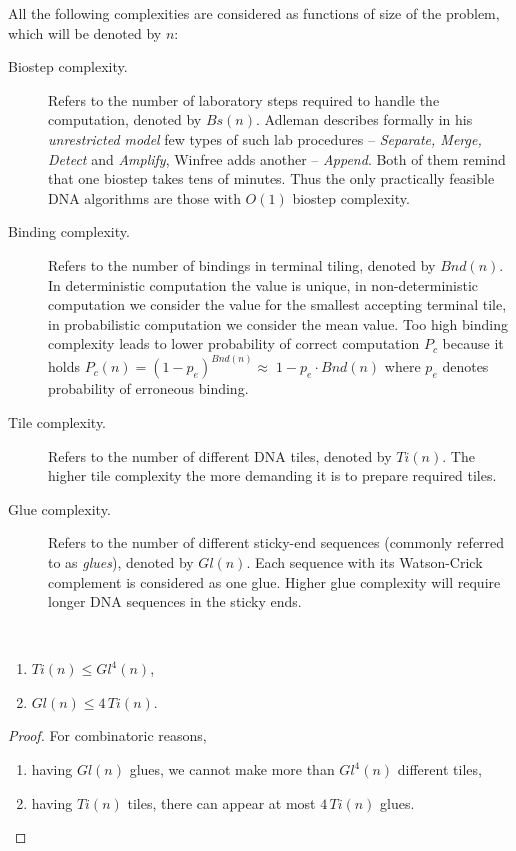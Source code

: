 	\begin{defn}
		\label{def:stud_compl}
		All the following complexities are considered as functions of size of the problem, which will be denoted by $n$:
		\begin{description}
			\item[Biostep complexity.] Refers to the number of laboratory steps required to handle the computation, denoted by $Bs(n)$. Adleman \cite{adleman95biostep} describes formally in his {\em unrestricted model} few types of such lab procedures -- {\em Separate, Merge, Detect} and {\em Amplify}, Winfree \cite{winfree_phd} adds another -- {\em Append}. Both of them remind that one biostep takes tens of mi\-nu\-tes. Thus the only practically feasible DNA algorithms are those with $O(1)$ biostep complexity.
			\item[Binding complexity.] Refers to the number of bindings in terminal tiling, denoted by $Bnd(n)$. In deterministic computation the value is unique, in non-deterministic computation we consider the value for the smallest accepting terminal tile, in probabilistic computation we consider the mean value. Too high binding complexity leads to lower probability of correct computation $P_c$ because it holds $P_c(n) = (1-p_e)^{Bnd(n)} \approx \; 1-p_e \cdot Bnd(n)$ where $p_e$ denotes probability of erroneous binding.
			\item[Tile complexity.] Refers to the number of different DNA tiles, denoted by $Ti(n)$. The higher tile complexity the more demanding it is to prepare required tiles.
			\item[Glue complexity.] Refers to the number of different sticky-end sequences (commonly referred to as {\em glues}), denoted by $Gl(n)$. Each sequence with its Watson-Crick complement is considered as one glue. Higher glue complexity will require longer DNA sequences in the sticky ends. %
		\end{description}
	\end{defn}
	
	\begin{lemma}
	\label{lem:ti_gl}
		~
		\begin{enumerate}
			\item $Ti(n) \leq Gl^4(n)$,
			\item $Gl(n) \leq 4\,Ti(n)$.
		\end{enumerate}
	\end{lemma}
	\begin{proof}
		For combinatoric reasons,
		\begin{enumerate}
			\item having $Gl(n)$ glues, we cannot make more than $Gl^4(n)$ different tiles,
			\item having $Ti(n)$ tiles, there can appear at most $4\,Ti(n)$ glues.
		\end{enumerate}
	\end{proof}
	
